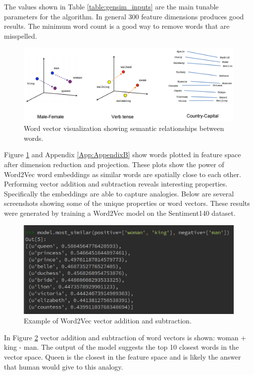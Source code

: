 \documentclass[12pt]{article}
\begin{document}
The values shown in Table \ref{table:gensim_inputs} are the main tunable parameters for the algorithm. In general 300 feature dimensions produces good results. The minimum word count is a good way to remove words that are misspelled. 

\begin{figure}[htbp!]
	\centering
	\includegraphics[scale=.3]{linear-relationships.png}
	\caption{Word vector visualization \cite{tensorflow} showing semantic relationships between words.}
	\label{fig:linear-relation}
\end{figure}

Figure \ref{fig:linear-relation} and Appendix \ref{App:AppendixB} show words plotted in feature space after dimension reduction and projection. These plots show the power of Word2Vec word embeddings as similar words are spatially close to each other. Performing vector addition and subtraction reveals interesting properties. Specifically the embeddings are able to capture analogies. Below are several screenshots showing some of the unique properties or word vectors. These results were generated by training a Word2Vec model on the Sentiment140 dataset.

\begin{figure}[htbp!]
	\centering
	\includegraphics[scale=.5]{man_woman.png}
	\caption{Example of Word2Vec vector addition and subtraction.}
	\label{fig:man_woman}
\end{figure}

In Figure \ref{fig:man_woman} vector addition and subtraction of word vectors is shown: woman + king - man. The output of the model suggests the top 10 closest words in the vector space. Queen is the closest in the feature space and is likely the answer that human would give to this analogy.
\end{document}
